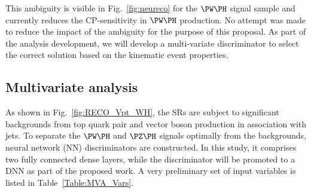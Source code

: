\documentclass[a4paper,11pt]{article}
\begin{document}
This ambiguity is visible in Fig.~\ref{fig:neureco} for the $\PW\PH$ signal sample and currently reduces the CP-sensitivity in $\PW\PH$ production. 
No attempt was made to reduce the impact of the ambiguity for the purpose of this proposal. 
As part of the analysis development, we will develop a multi-variate discriminator to select the correct solution based on the kinematic event properties. %

\subsection{Multivariate analysis}

As shown in Fig.~\ref{fig:RECO_Vpt_WH}, the SRs are subject to significant backgrounds from top quark pair  and vector boson production in association with jets.
To separate the  $\PW\PH$ and $\PZ\PH$ signals optimally from the backgrounds, neural network (NN) discriminators are constructed. 
In this study, it comprises two fully connected dense layers, while the discriminator will be promoted to a DNN 
as part of the proposed work.
A very preliminary set of input variables is listed in Table~\ref{Table:MVA_Vars}.
\end{document}
